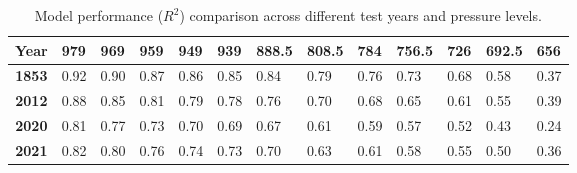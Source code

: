 \documentclass{article}
\begin{document}
    \begin{table}[htbp]
        \centering
        \caption{Model performance ($R^2$) comparison across different test years and pressure levels.}
        \label{tab:model_comparison}
        \begin{tabularx}{\textwidth}{c|*{12}{X}}
            \hline
            \textbf{Year} & \textbf{979} & \textbf{969} & \textbf{959} & \textbf{949} & \textbf{939} & \textbf{888.5} & \textbf{808.5} & \textbf{784} & \textbf{756.5} & \textbf{726} & \textbf{692.5} & \textbf{656} \\ 
            \hline
            \textbf{1853} & 0.92 & 0.90 & 0.87 & 0.86 & 0.85 & 0.84 & 0.79 & 0.76 & 0.73 & 0.68 & 0.58 & 0.37 \\
            \textbf{2012} & 0.88 & 0.85 & 0.81 & 0.79 & 0.78 & 0.76 & 0.70 & 0.68 & 0.65 & 0.61 & 0.55 & 0.39 \\
            \textbf{2020} & 0.81 & 0.77 & 0.73 & 0.70 & 0.69 & 0.67 & 0.61 & 0.59 & 0.57 & 0.52 & 0.43 & 0.24 \\
            \textbf{2021} & 0.82 & 0.80 & 0.76 & 0.74 & 0.73 & 0.70 & 0.63 & 0.61 & 0.58 & 0.55 & 0.50 & 0.36 \\ 
            \hline
        \end{tabularx}
    \end{table}
\end{document}

